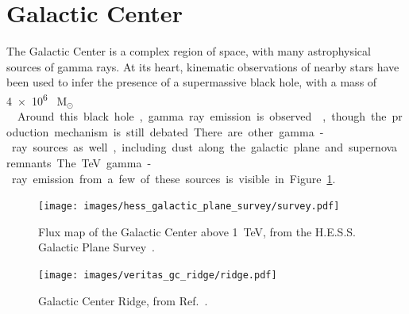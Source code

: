 \FloatBarrier

\section{Galactic Center}\label{sec:gc}
  
  The Galactic Center is a complex region of space, with many astrophysical sources of gamma rays.
  At its heart, kinematic observations of nearby stars have been used to infer the presence of a supermassive black hole, with a mass of \SI{4e6}{ M${{}_\odot}$ }\cite{sgra_massdist}.
  Around this black hole, gamma ray emission is observed~\cite{gc_pointsrc_hess,gc_pointsource_hess2,gc_veritas_pointsource,gc_magic_pointsource}, though the production mechanism is still debated.
  There are other gamma-ray sources as well, including dust along the galactic plane and supernova remnants.
  The TeV gamma-ray emission from a few of these sources is visible in Figure~\ref{fig:hess_plane}.
  
  \begin{figure}[!t]
    \centering
    \texttt{[image: images/hess\_galactic\_plane\_survey/survey.pdf]}
    \caption[HESS GC Survey]{
      Flux map of the Galactic Center above \SI{1}{\TeV}, from the H.E.S.S. Galactic Plane Survey~\cite{hess_gc_plane2}.
      \CaptionBlankLine
    }
    \label{fig:hess_plane}
  \end{figure}
  
  \begin{figure}[!b]
    \centering
    \texttt{[image: images/veritas\_gc\_ridge/ridge.pdf]}
    \caption[VERITAS View of the Galactic Center Ridge]{
      Galactic Center Ridge, from Ref.~\cite{VeritasGCRidge2015}.
      \CaptionBlankLine
    }
    \label{fig:veritas_gc_ridge}
  \end{figure}


